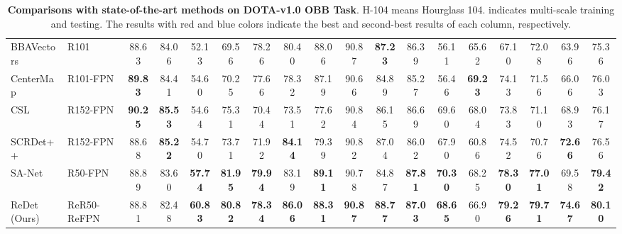 \documentclass[final]{cvpr}
\def\red#1{\textbf{\textcolor[RGB]{244, 67, 54}{#1}}}
\def\blue#1{\textbf{\textcolor[RGB]{60, 120, 216}{#1}}}
\def\redl#1{\textcolor[RGB]{244, 67, 54}{#1}}
\def\bluel#1{\textcolor[RGB]{60, 120, 216}{#1}}
\begin{document}
{\begin{table*}
\begin{center}
{\begin{tabular}{l|l|ccccccccccccccc|c}
BBAVectors~\cite{yi2020bbavector}      & R101        & 88.63        & 84.06        & 52.13        & 69.56        & 78.26        & 80.40        & 88.06        & 90.87        & \blue{87.23} & 86.39        & 56.11        & 65.62        & 67.10        & 72.08        & 63.96        & 75.36        \\
CenterMap~\cite{wang2020centermap}     & R101-FPN    & \blue{89.83} & 84.41        & 54.60        & 70.25        & 77.66        & 78.32        & 87.19        & 90.66        & 84.89        & 85.27        & 56.46        & \blue{69.23} & 74.13        & 71.56        & 66.06        & 76.03        \\
CSL~\cite{yang2020arbitrary}           & R152-FPN    & \red{90.25}  & \red{85.53}  & 54.64        & 75.31        & 70.44        & 73.51        & 77.62        & 90.84        & 86.15        & 86.69        & 69.60        & 68.04        & 73.83        & 71.10        & 68.93        & 76.17        \\
SCRDet++~\cite{yang2020scrdet++}       & R152-FPN    & 88.68        & \blue{85.22} & 54.70        & 73.71        & 71.92        & \blue{84.14} & 79.39        & 90.82        & 87.04        & 86.02        & 67.90        & 60.86        & 74.52        & 70.76        & \blue{72.66} & 76.56        \\
SA-Net~\cite{han2020align}         & R50-FPN     & 88.89        & 83.60        & \blue{57.74} & \red{81.95}  & \red{79.94}  & 83.19        & \red{89.11}  & 90.78        & 84.87        & \red{87.81}  & \red{70.30}  & 68.25        & \blue{78.30} & \blue{77.01} & 69.58        & \blue{79.42} \\
ReDet (Ours)                           & ReR50-ReFPN & 88.81        & 82.48        & \red{60.83}  & \blue{80.82} & \blue{78.34} & \red{86.06}  & \blue{88.31} & \blue{90.87} & \red{88.77}  & \blue{87.03} & \blue{68.65} & 66.90        & \red{79.26}  & \red{79.71}  & \red{74.67}  & \red{80.10}  \\ \hline 
\end{tabular}}
\end{center}    \vspace*{-3mm}
   \caption{\textbf{Comparisons with state-of-the-art methods on DOTA-v1.0 OBB Task}. H-104 means Hourglass 104.  indicates multi-scale training and testing. The results with \redl{red} and \bluel{blue} colors indicate the best and second-best results of each column, respectively.}
  \vspace*{-1mm}
   \label{tab:dota_sota}
\end{table*}

}
\end{document}
